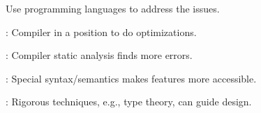 Use programming languages to address the issues.

\begin{citemize}
\item {}: Compiler in a position to do optimizations.
\item {}: Compiler static analysis finds more errors.
\item {}: Special syntax/semantics makes features more accessible.
\item {}: Rigorous techniques, e.g., type theory, can guide design.
\end{citemize}
\stopslide


\centerline{}
\stopslide


\centerline{}
\stopslide

